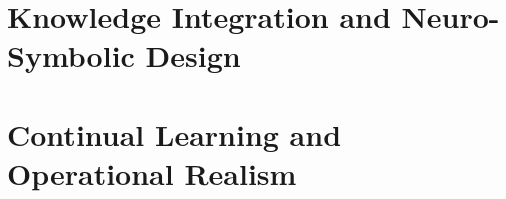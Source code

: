
\section{Knowledge Integration and Neuro-Symbolic Design}
\label{sec:disc_neurosym}


\section{Continual Learning and Operational Realism}
\label{sec:disc_continual}


